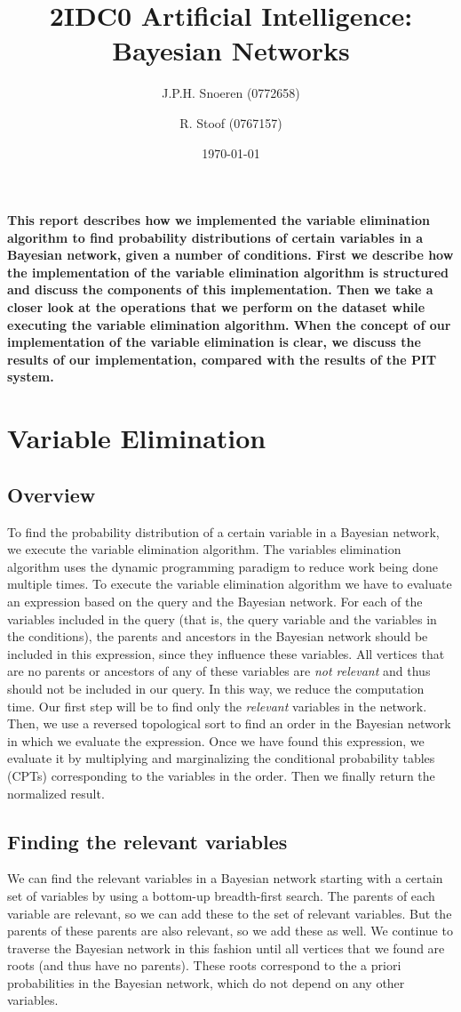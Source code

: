 \documentclass[10pt,a4paper]{article}
\author{J.P.H. Snoeren (0772658) \and R. Stoof (0767157)}
\date{\today}
\title{2IDC0 Artificial Intelligence: Bayesian Networks}
\begin{document}
\maketitle
\textbf{This report describes how we implemented the variable elimination algorithm to find probability distributions of certain variables in a Bayesian network, given a number of conditions. First we describe how the implementation of the variable elimination algorithm is structured and discuss the components of this implementation. Then we take a closer look at the operations that we perform on the dataset while executing the variable elimination algorithm. When the concept of our implementation of the variable elimination is clear, we discuss the results of our implementation, compared with the results of the PIT system.} 

\section{Variable Elimination}
\subsection{Overview}
To find the probability distribution of a certain variable in a Bayesian network, we execute the variable elimination algorithm. The variables elimination algorithm uses the dynamic programming paradigm to reduce work being done multiple times. To execute the variable elimination algorithm we have to evaluate an expression based on the query and the Bayesian network. For each of the variables included in the query (that is, the query variable and the variables in the conditions), the parents and ancestors in the Bayesian network should be included in this expression, since they influence these variables. All vertices that are no parents or ancestors of any of these variables are \emph{not relevant} and thus should not be included in our query. In this way, we reduce the computation time. Our first step will be to find only the \emph{relevant} variables in the network. Then, we use a reversed topological sort to find an order in the Bayesian network in which we evaluate the expression. Once we have found this expression, we evaluate it by multiplying and marginalizing the conditional probability tables (CPTs) corresponding to the variables in the order. Then we finally return the normalized result.
\subsection{Finding the relevant variables}
We can find the relevant variables in a Bayesian network starting with a certain set of variables by using a bottom-up breadth-first search. The parents of each variable are relevant, so we can add these to the set of relevant variables. But the parents of these parents are also relevant, so we add these as well. We continue to traverse the Bayesian network in this fashion until all vertices that we found are roots (and thus have no parents). These roots correspond to the a priori probabilities in the Bayesian network, which do not depend on any other variables. 
\end{document}
